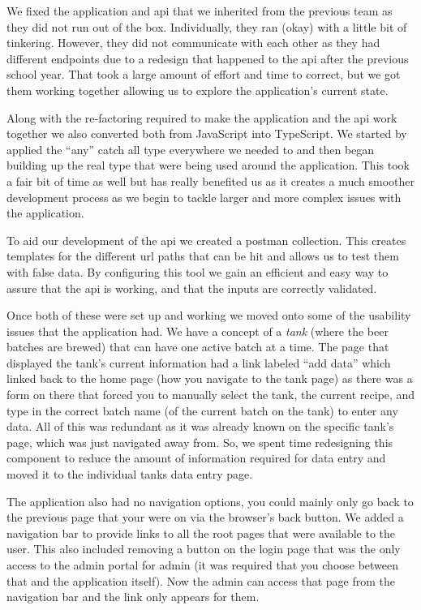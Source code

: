 \documentclass[draftclsnofoot,onecolumn,journal,letterpaper,compsoc,10pt]{IEEEtran}
\begin{document}
We fixed the application and api that we inherited from the previous team as they did not run out of the box.  Individually, they ran (okay) with a little bit of tinkering.  However, they did not communicate with each other as they had different endpoints due to a redesign that happened to the api after the previous school year.  That took a large amount of effort and time to correct, but we got them working together allowing us to explore the application's current state.

Along with the re-factoring required to make the application and the api work together we also converted both from JavaScript into TypeScript.  We started by applied the ``any'' catch all type everywhere we needed to and then began building up the real type that were being used around the application.  This took a fair bit of time as well but has really benefited us as it creates a much smoother development process as we begin to tackle larger and more complex issues with the application.

To aid our development of the api we created a postman collection.  This creates templates for the different url paths that can be hit and allows us to test them with false data.  By configuring this tool we gain an efficient and easy way to assure that the api is working, and that the inputs are correctly validated.

Once both of these were set up and working we moved onto some of the usability issues that the application had.  We have a concept of a {\em tank} (where the beer batches are brewed) that can have one active batch at a time.  The page that displayed the tank's current information had a link labeled ``add data'' which linked back to the home page (how you navigate to the tank page) as there was a form on there that forced you to manually select the tank, the current recipe, and type in the correct batch name (of the current batch on the tank) to enter any data.  All of this was redundant as it was already known on the specific tank's page, which was just navigated away from.  So, we spent time redesigning this component to reduce the amount of information required for data entry and moved it to the individual tanks data entry page.

The application also had no navigation options, you could mainly only go back to the previous page that your were on via the browser's back button.  We added a navigation bar to provide links to all the root pages that were available to the user.  This also included removing a button on the login page that was the only access to the admin portal for admin (it was required that you choose between that and the application itself).  Now the admin can access that page from the navigation bar and the link only appears for them.
\end{document}
